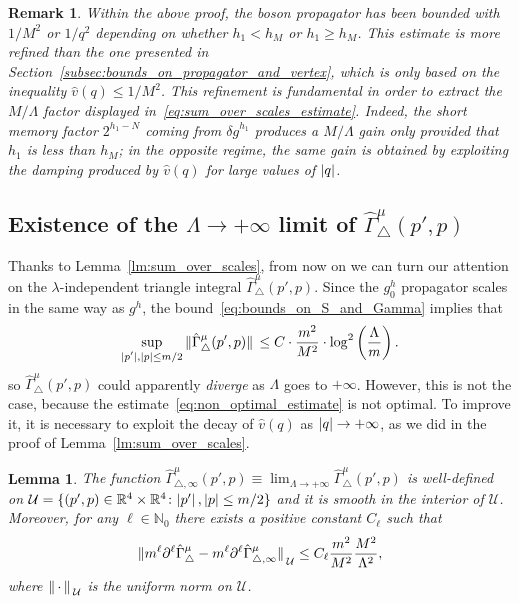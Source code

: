 \documentclass[a4paper, 11pt]{article}
\newcommand{\R}{\mathbb{R}}
\newcommand{\N}{\mathbb{N}}
\newcommand{\cutoff}{\Lambda}								%
\newcommand{\sing}[2]{{#1}^{#2}}							%
\theoremstyle{thm}
\newtheorem{lm}{Lemma}
\newtheorem{rmk}{Remark}
\begin{document}
\begin{rmk}
\label{rmk:optimal_bound}
Within the above proof, the boson propagator has been bounded with $1/M^2$ or $1/q^2$ depending on whether $h_1 < h_M$ or $h_1 \ge h_M$. This estimate is \emph{more refined} than the one presented in Section~\ref{subsec:bounds_on_propagator_and_vertex}, which is only based on the inequality $\hat{v}(q) \le 1/M^2$. This refinement is \emph{fundamental} in order to extract the $M/\cutoff$ factor displayed in~\eqref{eq:sum_over_scales_estimate}. Indeed, the short memory factor $2^{h_1 - N}$ coming from $\sing{\delta g}{h_1}$ produces a $M/\cutoff$ gain only provided that $h_1$ is less than $h_M$; in the opposite regime, the same gain is obtained by exploiting the damping produced by $\hat{v}(q)$ for large values of $\abs{q}$.
\end{rmk}


\subsection{Existence of the \texorpdfstring{$\cutoff \to +\infty$}{ctinf} limit of \texorpdfstring{$\hat{\Gamma}^\mu_\triangle(p', p)$}{g}}
\label{subsec:cutoff_removal_triangle}

Thanks to Lemma~\ref{lm:sum_over_scales}, from now on we can turn our attention on the $\lambda$-independent triangle integral $\hat{\Gamma}^\mu_\triangle(p', p)$. Since the $\sing{g}{h}_0$ propagator scales in the same way as $\sing{g}{h}$, the bound~\eqref{eq:bounds_on_S_and_Gamma} implies that
\begin{equation}
\label{eq:non_optimal_estimate}
\sup_{\abs*{p'}, \abs{p} \le m/2} \norm*{\hat{\Gamma}^\mu_\triangle(p', p)} \le C \cdot \frac{m^2}{M^2} \cdot \log^2 \left( \frac{\cutoff}{m} \right).
\end{equation}
so $\hat{\Gamma}^\mu_\triangle(p', p)$ could apparently \emph{diverge} as $\cutoff$ goes to $+\infty$. However, this is not the case, because the estimate~\eqref{eq:non_optimal_estimate} is not optimal. To improve it, it is necessary to exploit the decay of $\hat{v}(q)$ as $\abs{q} \to +\infty$, as we did in the proof of Lemma~\ref{lm:sum_over_scales}.
\begin{lm}
\label{lm:optimal_estimate}
The function $\hat{\Gamma}^\mu_{\triangle, \infty}(p', p) \equiv \lim_{\cutoff \to +\infty} \hat{\Gamma}^\mu_\triangle(p', p)$ is well-defined on $\mathcal{U} = \lbrace (p', p) \in \R^4 \times \R^4 \colon \abs*{p'}, \abs{p} \le m/2 \rbrace$ and it is smooth in the interior of $\mathcal{U}$. Moreover, for any $\ell \in \N_0$ there exists a positive constant $C_\ell$ such that
\begin{equation}
\label{eq:lm:optimal_estimate_convergence}
\norm*{m^\ell \partial^\ell \hat{\Gamma}^\mu_\triangle - m^\ell \partial^\ell \hat{\Gamma}^\mu_{\triangle, \infty}}_\mathcal{U} \le C_\ell \frac{m^2}{M^2} \frac{M^2}{\cutoff^2},
\end{equation}
where $\norm*{\, \cdot \,}_\mathcal{U}$ is the uniform norm on $\mathcal{U}$.
\end{lm}
\end{document}
